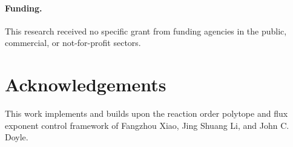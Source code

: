\documentclass[11pt]{article}
\begin{document}
\paragraph{Funding.} This research received no specific grant from funding agencies in the
public, commercial, or not-for-profit sectors.

\section*{Acknowledgements}
This work implements and builds upon the reaction order polytope and flux exponent control
framework of Fangzhou Xiao, Jing Shuang Li, and John C. Doyle.



\end{document}
